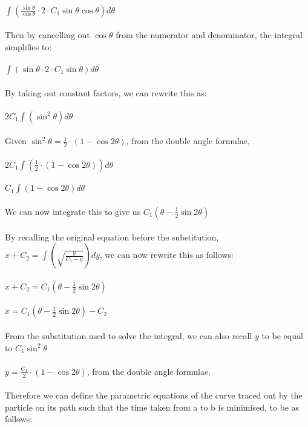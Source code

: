 \documentclass[12pt]{report}
\begin{document}
\\
\implies \(\int(\frac{\sin{\theta}}{\cos{\theta}} \cdot 2 \cdot C_{1}\sin{\theta}\cos{\theta}) d\theta\)
\\
\\
Then by cancelling out \(\cos{\theta}\) from the numerator and denominator, the integral simplifies to:
\\
\\
\(\int(\sin{\theta} \cdot 2 \cdot C_{1}\sin{\theta}) d\theta\)
\\
\\
By taking out constant factors, we can rewrite this as:
\\
\\
\(2C_{1}\int (\sin^2{\theta}) d\theta\)
\\
\\
Given \(\sin^2{\theta} = \frac{1}{2}\cdot (1-\cos{2\theta})\), from the double angle formulae,
\\
\\
\implies \(2C_{1}\int (\frac{1}{2}\cdot (1-\cos{2\theta})) d\theta\)
\\
\\
\implies \(C_{1}\int (1-\cos{2\theta}) d\theta\)
\\
\\
We can now integrate this to give us \(C_{1} (\theta-\frac{1}{2}\sin{2\theta})\)
\\
\\
By recalling the original equation before the substitution, \(x + C_{2} = \int (\sqrt{\frac{y}{C_{1}-y}})dy\), we can now rewrite this as follows:
\\
\\
\(x + C_{2} = C_{1} (\theta-\frac{1}{2}\sin{2\theta})\)
\\
\\
\implies \(x = C_{1} (\theta-\frac{1}{2}\sin{2\theta}) - C_{2}\)
\\
\\
From the substitution used to solve the integral, we can also recall \(y\) to be equal to \(C_{1}\sin^2{\theta}\)
\\
\\
\implies \(y =\frac{C_{1}}{2} \cdot (1-\cos{2\theta}) \), from the double angle formulae.
\\
\\
Therefore we can define the parametric equations of the curve traced out by the particle on its path such that the time taken from a to b is minimised, to be as follows:
\\
\\
\end{document}
